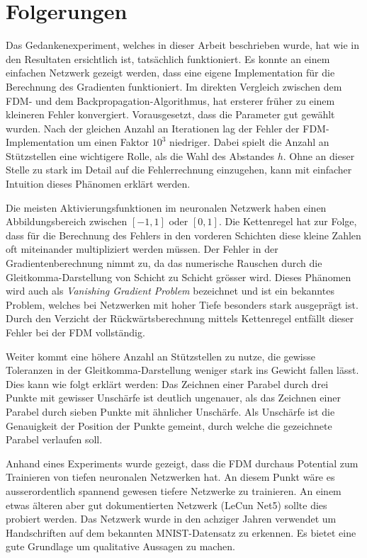 %
%
%
\section{Folgerungen
\label{ableitung:section:folgerungen}}
Das Gedankenexperiment, welches in dieser Arbeit beschrieben wurde, hat wie in den Resultaten ersichtlich ist, tatsächlich funktioniert. Es konnte an einem einfachen Netzwerk gezeigt werden, dass eine eigene Implementation für die Berechnung des Gradienten funktioniert. Im direkten Vergleich zwischen dem FDM- und dem Backpropagation-Algorithmus, hat ersterer früher zu einem kleineren Fehler konvergiert. Vorausgesetzt, dass die Parameter gut gewählt wurden. Nach der gleichen Anzahl an Iterationen lag der Fehler der FDM-Implementation um einen Faktor $10^3$ niedriger. Dabei spielt die Anzahl an Stützstellen eine wichtigere Rolle, als die Wahl des Abstandes $h$. Ohne an dieser Stelle zu stark im Detail auf die Fehlerrechnung einzugehen, kann mit einfacher Intuition dieses Phänomen erklärt werden.

Die meisten Aktivierungsfunktionen im neuronalen Netzwerk haben einen Abbildungsbereich zwischen $[-1, 1]$ oder $[0, 1]$. Die Kettenregel hat zur Folge, dass für die Berechnung des Fehlers in den vorderen Schichten diese kleine Zahlen oft miteinander multipliziert werden müssen. Der Fehler in der Gradientenberechnung nimmt zu, da das numerische Rauschen durch die Gleitkomma-Darstellung von Schicht zu Schicht grösser wird. Dieses Phänomen wird auch als \textit{Vanishing Gradient Problem} bezeichnet und ist ein bekanntes Problem, welches bei Netzwerken mit hoher Tiefe besonders stark ausgeprägt ist. Durch den Verzicht der Rückwärtsberechnung mittels Kettenregel entfällt dieser Fehler bei der FDM vollständig. 

Weiter kommt eine höhere Anzahl an Stützstellen zu nutze, die gewisse Toleranzen in der Gleitkomma-Darstellung weniger stark ins Gewicht fallen lässt. Dies kann wie folgt erklärt werden: Das Zeichnen einer Parabel durch drei Punkte mit gewisser Unschärfe ist deutlich ungenauer, als das Zeichnen einer Parabel durch sieben Punkte mit ähnlicher Unschärfe. Als Unschärfe ist die Genauigkeit der Position der Punkte gemeint, durch welche die gezeichnete Parabel verlaufen soll.

Anhand eines Experiments wurde gezeigt, dass die FDM durchaus Potential zum Trainieren von tiefen neuronalen Netzwerken hat. An diesem Punkt wäre es ausserordentlich spannend gewesen tiefere Netzwerke zu trainieren. An einem etwas älteren aber gut dokumentierten Netzwerk (LeCun Net5) sollte dies probiert werden. Das Netzwerk wurde in den achziger Jahren verwendet um Handschriften auf dem bekannten MNIST-Datensatz zu erkennen. Es bietet eine gute Grundlage um qualitative Aussagen zu machen. 

